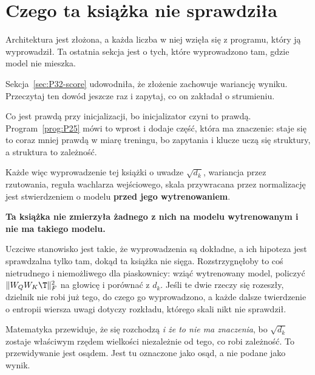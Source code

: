 
\section{Czego ta książka nie sprawdziła}
\label{sec:P32-unchecked}

\begin{fr}
Architektura jest złożona, a każda liczba w niej wzięła się z programu, który
ją wyprowadził. Ta ostatnia sekcja jest o tych, które wyprowadzono tam, gdzie
model nie mieszka.

Sekcja~\ref{sec:P32-score} udowodniła, że złożenie zachowuje wariancję wyniku.
Przeczytaj ten dowód jeszcze raz i zapytaj, co on zakładał o strumieniu.
\dotline
\nextframe
\end{fr}

\begin{fr}

Co jest prawdą przy inicjalizacji, bo inicjalizator czyni to prawdą.
Program~\ref{prog:P25} mówi to wprost i dodaje część, która ma znaczenie:
staje się to coraz mniej prawdą w miarę treningu, bo zapytania i klucze uczą
się struktury, a struktura to zależność.

Każde więc wyprowadzenie tej książki o uwadze \dash{} $\sqrt{d_k}$, wariancja
przez rzutowania, reguła wachlarza wejściowego, skala przywracana przez
normalizację \dash{} jest stwierdzeniem o modelu \textbf{przed jego
wytrenowaniem}.

\begin{warning}
\textbf{Ta książka nie zmierzyła żadnego z nich na modelu wytrenowanym i nie
ma takiego modelu.}

Uczciwe stanowisko jest takie, że wyprowadzenia są dokładne, a ich hipoteza
jest sprawdzalna tylko tam, dokąd ta książka nie sięga. Rozstrzygnęłoby to coś
nietrudnego i niemożliwego dla piaskownicy: wziąć wytrenowany model, policzyć
$\lVert W_Q W_K\T\rVert_F^{2}$ na głowicę i porównać z $d_k$. Jeśli te dwie
rzeczy się rozeszły, dzielnik nie robi już tego, do czego go wyprowadzono, a
każde dalsze twierdzenie o entropii wiersza uwagi dotyczy rozkładu, którego
skali nikt nie sprawdził.

Matematyka przewiduje, że się rozchodzą \emph{i że to nie ma znaczenia}, bo
$\sqrt{d_k}$ zostaje właściwym rzędem wielkości niezależnie od tego, co robi
zależność. To przewidywanie jest osądem. Jest tu oznaczone jako osąd, a nie
podane jako wynik.
\end{warning}
\end{fr}

